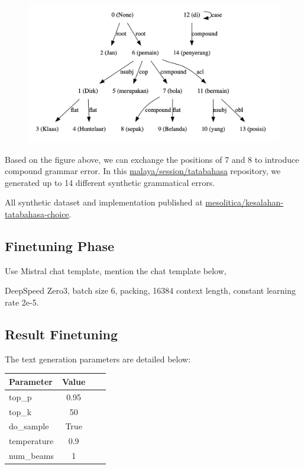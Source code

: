 \documentclass{article}
\begin{document}
\pagebreak

\begin{figure}[h]
  \centering
  \includegraphics[width=0.6\linewidth]{pic/dependency.png} %
\end{figure}

Based on the figure above, we can exchange the positions of 7 and 8 to introduce compound grammar error. In this \href{https://github.com/mesolitica/malaya/tree/master/session/tatabahasa/prepare-dataset}{malaya/session/tatabahasa} repository, we generated up to 14 different synthetic grammatical errors.

All synthetic dataset and implementation published at \href{https://huggingface.co/datasets/mesolitica/kesalahan-tatabahasa-choice}{mesolitica/kesalahan-tatabahasa-choice}.

\subsection{Finetuning Phase}

Use Mistral chat template, mention the chat template below,

DeepSpeed Zero3, batch size 6, packing, 16384 context length, constant learning rate 2e-5.


\subsection{Result Finetuning}

The text generation parameters are detailed below:

\begin{table}[h]
  \centering
  \begin{tabular}{lccl}
    \hline
    \textbf{Parameter} & \textbf{Value} \\
    \hline
    top\_p             & 0.95           \\
    top\_k             & 50             \\
    do\_sample         & True           \\
    temperature        & 0.9            \\
    num\_beams         & 1              \\
    \hline
  \end{tabular}
\end{table}
\end{document}
